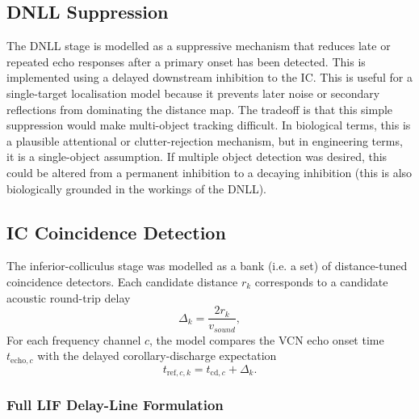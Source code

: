\subsection{DNLL Suppression}

The DNLL stage is modelled as a suppressive mechanism that reduces late or repeated echo responses after a primary onset has been detected. This is implemented using a delayed downstream inhibition to the IC. This is useful for a single-target localisation model because it prevents later noise or secondary reflections from dominating the distance map. The tradeoff is that this simple suppression would make multi-object tracking difficult. In biological terms, this is a plausible attentional or clutter-rejection mechanism, but in engineering terms, it is a single-object assumption. If multiple object detection was desired, this could be altered from a permanent inhibition to a decaying inhibition (this is also biologically grounded in the workings of the DNLL).

\subsection{IC Coincidence Detection}

The inferior-colliculus stage was modelled as a bank (i.e. a set) of distance-tuned coincidence detectors. Each candidate distance $r_k$ corresponds to a candidate acoustic round-trip delay
\begin{equation}
    \Delta_k = \frac{2r_k}{v_{sound}},
\end{equation}
For each frequency channel $c$, the model compares the VCN echo onset time $t_{\mathrm{echo},c}$ with the delayed corollary-discharge expectation
\begin{equation}
    t_{\mathrm{ref},c,k} = t_{\mathrm{cd},c} + \Delta_k .
\end{equation}

\subsubsection{Full LIF Delay-Line Formulation}


